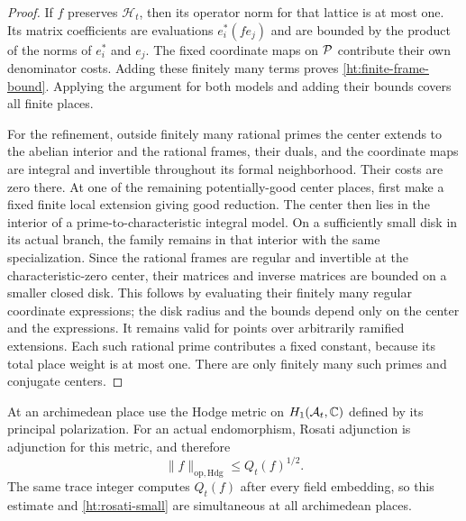 \begin{proof}
If $f$ preserves $\mathscr H_t$, then its operator norm for that
lattice is at most one. Its matrix coefficients are evaluations
$e_i^*(fe_j)$ and are bounded by the product of the norms of $e_i^*$
and $e_j$. The fixed coordinate maps on $\mathcal P$ contribute their own
denominator costs. Adding these finitely many terms proves
\eqref{ht:finite-frame-bound}. Applying the argument for both models
and adding their bounds covers all finite places.

For the refinement, outside finitely many rational primes the center
extends to the abelian interior and the rational frames, their duals,
and the coordinate maps are integral and invertible throughout its
formal neighborhood. Their costs are zero there. At one of the
remaining potentially-good center places, first make a fixed finite
local extension giving good reduction. The center then lies in the
interior of a prime-to-characteristic integral model. On a sufficiently
small disk in its actual branch, the family remains in that interior
with the same specialization. Since the rational frames are regular
and invertible at the characteristic-zero center, their matrices and
inverse matrices are bounded on a smaller closed disk. This follows
by evaluating their finitely many regular coordinate expressions;
the disk radius and the bounds depend only on the center and the
expressions. It remains valid for points over arbitrarily ramified
extensions. Each such rational prime contributes a fixed constant,
because its total place weight is at most one. There are only
finitely many such primes and conjugate centers.
\end{proof}

At an archimedean place use the Hodge metric on $H_1(\mathcal A_t,\mathbb C)$
defined by its principal polarization. For an actual endomorphism,
Rosati adjunction is adjunction for this metric, and therefore
\begin{equation}\label{ht:hodge-operator}
 \|f\|_{\mathrm{op,Hdg}}\leq Q_t(f)^{1/2}.
\end{equation}
The same trace integer computes $Q_t(f)$ after every field embedding,
so this estimate and \eqref{ht:rosati-small} are simultaneous at all
archimedean places.

